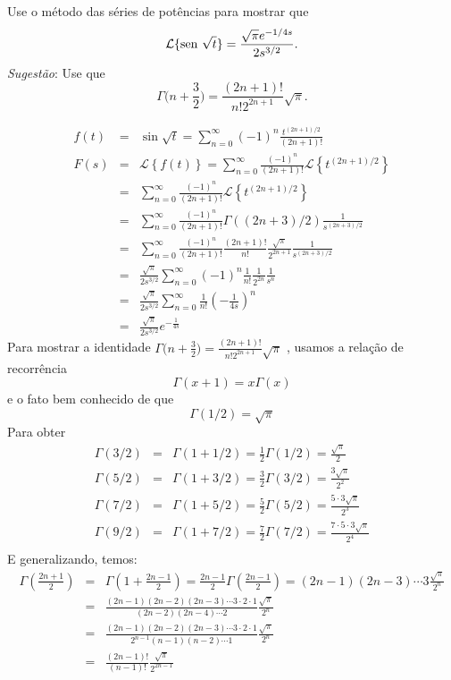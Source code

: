 \begin{exer}
Use o método das séries de potências para mostrar que \[\mathcal{L} \{\operatorname{sen}\, \sqrt{t} \} =  \frac{\sqrt{\pi} e^{-1/4s}}{2s^{3/2}}.\]
\emph{Sugestão}: Use que \[\Gamma\bigg( n + \frac{3}{2} \bigg) = \frac{ (2n+1)!}{ n! 2^{2n+1}}\sqrt{\pi}.\]
\end{exer}
\begin{resp}
 \begin{eqnarray*}
f(t)&=&\sin\sqrt{t}= \sum_{n=0}^{\infty}(-1)^n\frac{t^{(2n+1)/2}}{(2n+1)!}\\
F(s)&=&\mathcal{L}\left\{f(t)\right\}=\sum_{n=0}^{\infty}\frac{(-1)^n}{{(2n+1)!}}\mathcal{L}\left\{{t^{(2n+1)/2}}\right\}\\
&=&\sum_{n=0}^{\infty}\frac{(-1)^n}{{(2n+1)!}}\mathcal{L}\left\{{t^{(2n+1)/2}}\right\}\\
&=&\sum_{n=0}^{\infty}\frac{(-1)^n}{{(2n+1)!}}\Gamma\left((2n+3)/2\right)\frac{1}{s^{(2n+3)/2}}\\
&=&\sum_{n=0}^{\infty}\frac{(-1)^n}{{(2n+1)!}}\frac{(2n+1)!}{n!}\frac{\sqrt{\pi}}{2^{2n+1}}\frac{1}{s^{(2n+3)/2}}\\
&=&\frac{\sqrt{\pi}}{2s^{3/2}}\sum_{n=0}^{\infty}{(-1)^n}\frac{1}{n!}\frac{1}{2^{2n}}\frac{1}{s^{n}}\\
&=&\frac{\sqrt{\pi}}{2s^{3/2}}\sum_{n=0}^{\infty}\frac{1}{n!}{\left(-\frac{1}{4s}\right)^{n}}\\
&=&\frac{\sqrt{\pi}}{2s^{3/2}}e^{-\frac{1}{4s}}
\end{eqnarray*}
Para mostrar a identidade $\Gamma\bigg( n + \frac{3}{2} \bigg) = \frac{ (2n+1)!}{ n! 2^{2n+1}}\sqrt{\pi}$ , usamos a relação de recorrência
\begin{equation}\Gamma(x+1)=x\Gamma(x)\end{equation}
e o fato bem conhecido  de que
\begin{equation}\Gamma(1/2)=\sqrt{\pi}\end{equation}
Para obter
\begin{eqnarray*}
\Gamma(3/2)&=&\Gamma(1+1/2)=\frac{1}{2}\Gamma(1/2)=\frac{\sqrt{\pi}}{2}\\
\Gamma(5/2)&=&\Gamma(1+3/2)=\frac{3}{2}\Gamma(3/2)=\frac{3\sqrt{\pi}}{2^2}\\
\Gamma(7/2)&=&\Gamma(1+5/2)=\frac{5}{2}\Gamma(5/2)=\frac{5 \cdot 3\sqrt{\pi}}{2^3}\\
\Gamma(9/2)&=&\Gamma(1+7/2)=\frac{7}{2}\Gamma(7/2)=\frac{7\cdot 5 \cdot 3\sqrt{\pi}}{2^4}\\
\end{eqnarray*}
E generalizando, temos:
\begin{eqnarray*}
\Gamma\left(\frac{2n+1}{2}\right)&=&\Gamma\left(1+\frac{2n-1}{2}\right)=\frac{2n-1}{2}\Gamma\left(\frac{2n-1}{2}\right)={(2n-1)(2n-3)\cdots 3}\frac{\sqrt{\pi}}{2^{n}}\\
&=&\frac{(2n-1)(2n-2)(2n-3)\cdots 3\cdot 2 \cdot 1}{(2n-2)(2n-4)\cdots 2}\frac{\sqrt{\pi}}{2^{n}}\\
&=&\frac{(2n-1)(2n-2)(2n-3)\cdots 3\cdot 2 \cdot 1}{2^{n-1}(n-1)(n-2)\cdots 1}\frac{\sqrt{\pi}}{2^{n}}\\
&=&\frac{(2n-1)!}{(n-1)!}\frac{\sqrt{\pi}}{2^{2n-1}}
\end{eqnarray*}
\end{resp}

